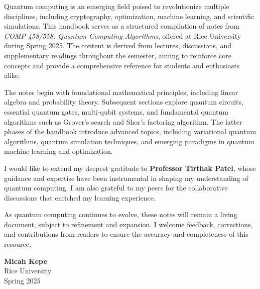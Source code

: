 Quantum computing is an emerging field poised to revolutionize multiple
disciplines, including cryptography, optimization, machine learning, and
scientific simulations. This handbook serves as a structured compilation of
notes from \textit{COMP 458/558: Quantum Computing Algorithms}, offered at Rice
University during Spring 2025. The content is derived from lectures,
discussions, and supplementary readings throughout the semester, aiming to
reinforce core concepts and provide a comprehensive reference for students
and enthusiasts alike.

\vspace{0.3cm}

\noindent
The notes begin with foundational mathematical principles, including linear
algebra and probability theory. Subsequent sections explore quantum circuits,
essential quantum gates, multi-qubit systems, and fundamental quantum
algorithms such as Grover’s search and Shor’s factoring algorithm. The latter
phases of the handbook introduce advanced topics, including variational
quantum algorithms, quantum simulation techniques, and emerging paradigms in
quantum machine learning and optimization.

\vspace{0.3cm}

\noindent
I would like to extend my deepest gratitude to \textbf{Professor Tirthak Patel},
whose guidance and expertise have been instrumental in shaping my
understanding of quantum computing. I am also grateful to my peers for the
collaborative discussions that enriched my learning experience.

\vspace{0.3cm}

\noindent
As quantum computing continues to evolve, these notes will remain a living
document, subject to refinement and expansion. I welcome feedback,
corrections, and contributions from readers to ensure the accuracy and
completeness of this resource.

\vspace{1cm}

\noindent \textbf{Micah Kepe}  \\
Rice University  \\
Spring 2025
